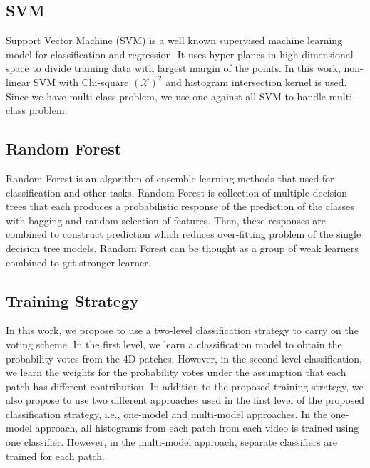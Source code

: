 \subsection{SVM}
\label{section:SVM}
Support Vector Machine (SVM) is a well known supervised machine learning model for classification and regression. It uses hyper-planes in high dimensional space to divide training data with largest margin of the points. In this work, non-linear SVM with Chi-square $ \left(\mathcal{X}\right)^{2} $ and histogram intersection kernel is used. Since we have multi-class problem, we use one-against-all SVM to handle multi-class problem.



\subsection{Random Forest}
\label{section:RandomForest}
Random Forest is an algorithm of ensemble learning methods that used for classification and other tasks. Random Forest is collection of multiple decision trees that each produces a probabilistic response of the prediction of the classes with bagging and random selection of features. Then, these responses are combined to construct prediction which reduces over-fitting problem of the single decision tree models. Random Forest can be thought as a group of weak learners combined to get stronger learner.



\subsection{Training Strategy}
\label{section:TrainingStrategy}
In this work, we propose to use a two-level classification strategy to carry on the voting scheme. In the first level, we learn a classification model to obtain the probability votes from the 4D patches. However, in the second level classification, we learn the weights for the probability votes under the assumption that each patch has different contribution. In addition to the proposed training strategy, we also propose to use two different approaches used in the first level of the proposed classification strategy, i.e., one-model and multi-model approaches. In the one-model approach, all histograms from each patch from each video is trained using one classifier. However, in the multi-model approach, separate classifiers are trained for each patch.

